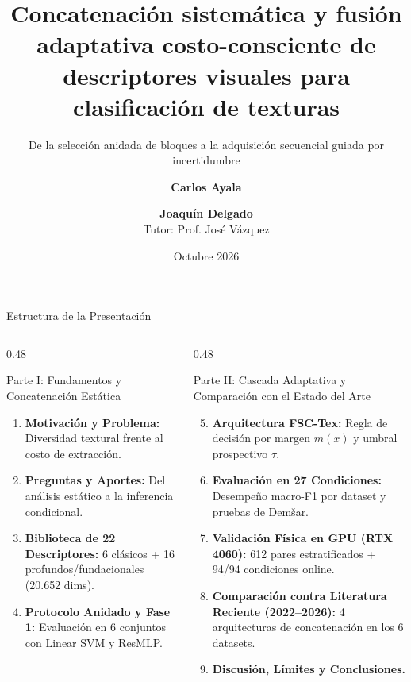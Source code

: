 \documentclass[aspectratio=169,10pt]{beamer}
\title[Defensa de Tesis — FSC-Tex]{Concatenación sistemática y fusión adaptativa costo-consciente de descriptores visuales para clasificación de texturas}
\subtitle{De la selección anidada de bloques a la adquisición secuencial guiada por incertidumbre}
\author[C. Ayala \& J. Delgado]{\textbf{Carlos Ayala} \and \textbf{Joaquín Delgado} \\[0.4em] {\small Tutor: Prof. José Vázquez}}
\institute[FP-UNA]{Universidad Nacional de Asunción \\ Facultad Politécnica}
\date[Octubre 2026]{Octubre 2026}
\begin{document}
\begin{frame}
\titlepage
\end{frame}

\begin{frame}{Estructura de la Presentación}
\begin{columns}[T]
\begin{column}{0.48\textwidth}
\begin{block}{Parte I: Fundamentos y Concatenación Estática}
\begin{enumerate}
\item \textbf{Motivación y Problema:} Diversidad textural frente al costo de extracción.
\item \textbf{Preguntas y Aportes:} Del análisis estático a la inferencia condicional.
\item \textbf{Biblioteca de 22 Descriptores:} 6 clásicos + 16 profundos/fundacionales (20.652 dims).
\item \textbf{Protocolo Anidado y Fase 1:} Evaluación en 6 conjuntos con Linear SVM y ResMLP.
\end{enumerate}
\end{block}
\end{column}
\begin{column}{0.48\textwidth}
\begin{block}{Parte II: Cascada Adaptativa y Comparación con el Estado del Arte}
\begin{enumerate}\setcounter{enumi}{4}
\item \textbf{Arquitectura FSC-Tex:} Regla de decisión por margen $m(x)$ y umbral prospectivo $\tau$.
\item \textbf{Evaluación en 27 Condiciones:} Desempeño macro-F1 por dataset y pruebas de Demšar.
\item \textbf{Validación Física en GPU (RTX 4060):} 612 pares estratificados + 94/94 condiciones online.
\item \textbf{Comparación contra Literatura Reciente (2022--2026):} 4 arquitecturas de concatenación en los 6 datasets.
\item \textbf{Discusión, Límites y Conclusiones.}
\end{enumerate}
\end{block}
\end{column}
\end{columns}
\end{frame}
\end{document}
